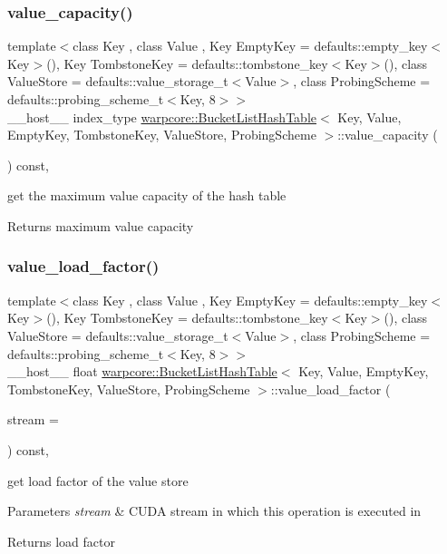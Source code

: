 \subsubsection{\texorpdfstring{value\+\_\+capacity()}{value\_capacity()}}
{\footnotesize\ttfamily template$<$class Key , class Value , Key Empty\+Key = defaults\+::empty\+\_\+key$<$\+Key$>$(), Key Tombstone\+Key = defaults\+::tombstone\+\_\+key$<$\+Key$>$(), class Value\+Store  = defaults\+::value\+\_\+storage\+\_\+t$<$\+Value$>$, class Probing\+Scheme  = defaults\+::probing\+\_\+scheme\+\_\+t$<$\+Key, 8$>$$>$ \\
\+\_\+\+\_\+host\+\_\+\+\_\+ index\+\_\+type \hyperlink{classwarpcore_1_1BucketListHashTable}{warpcore\+::\+Bucket\+List\+Hash\+Table}$<$ Key, Value, Empty\+Key, Tombstone\+Key, Value\+Store, Probing\+Scheme $>$\+::value\+\_\+capacity (\begin{DoxyParamCaption}{ }\end{DoxyParamCaption}) const\hspace{0.3cm}{\ttfamily [inline]}, {\ttfamily [noexcept]}}



get the maximum value capacity of the hash table 

\begin{DoxyReturn}{Returns}
maximum value capacity 
\end{DoxyReturn}
\mbox{\label{classwarpcore_1_1BucketListHashTable_a710d3038814c3db16ac5b1fa4df84204}} 
\subsubsection{\texorpdfstring{value\+\_\+load\+\_\+factor()}{value\_load\_factor()}}
{\footnotesize\ttfamily template$<$class Key , class Value , Key Empty\+Key = defaults\+::empty\+\_\+key$<$\+Key$>$(), Key Tombstone\+Key = defaults\+::tombstone\+\_\+key$<$\+Key$>$(), class Value\+Store  = defaults\+::value\+\_\+storage\+\_\+t$<$\+Value$>$, class Probing\+Scheme  = defaults\+::probing\+\_\+scheme\+\_\+t$<$\+Key, 8$>$$>$ \\
\+\_\+\+\_\+host\+\_\+\+\_\+ float \hyperlink{classwarpcore_1_1BucketListHashTable}{warpcore\+::\+Bucket\+List\+Hash\+Table}$<$ Key, Value, Empty\+Key, Tombstone\+Key, Value\+Store, Probing\+Scheme $>$\+::value\+\_\+load\+\_\+factor (\begin{DoxyParamCaption}\item[{const cuda\+Stream\+\_\+t}]{stream = {} }\end{DoxyParamCaption}) const\hspace{0.3cm}{\ttfamily [inline]}, {\ttfamily [noexcept]}}



get load factor of the value store 


\begin{DoxyParams}{Parameters}
{\em stream} & C\+U\+DA stream in which this operation is executed in \\
\hline
\end{DoxyParams}
\begin{DoxyReturn}{Returns}
load factor 
\end{DoxyReturn}
